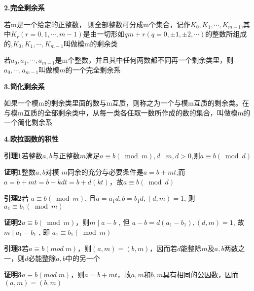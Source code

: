 \documentclass[a4paper,12pt]{article}
\begin{document}
\textbf{2.完全剩余系}\par
若m是一个给定的正整数， 则全部整数可分成m个集合，记作$K_0,K_1,\cdots,K_{m-1}$,其中$K_r(r=0,1,\cdots,m-1)$是由一切形如$qm+r(q=0,\pm1,\pm2,\cdots)$的整数所组成的,$K_0,K_1,\cdots,K_{m-1}$叫做模m的剩余类\par 
若$a_0,a_1,\cdots,a_{m-1}$是m个整数，并且其中任何两数都不同再一个剩余类里，则$a_0,\cdots,a_{m-1}$叫做模$m$的一个完全剩余系\par 
\quad  \par 



\textbf{3.简化剩余系}\par
如果一个模m的剩余类里面的数与m互质，则称之为一个与模m互质的剩余类。在与模m互质的全部剩余类中，从每一类各任取一数所作成的数的集合，叫做模m的一个简化剩余系\par
\quad  \par 



\textbf{4.欧拉函数的积性}\par

\textbf{引理1}\quad 若整数$a,b$与正整数$m$满足$a \equiv b(\bmod m), d \mid m, d>0 $,则$a \equiv b(\bmod d) $\par
\textbf{证明1}\quad 整数$  a, b  $对模 $ m  $同余的充分与必要条件是$a=b+m t$,而$a=b+mt=b+kdt=b+d(kt)$，故$a \equiv b(\bmod d) $\par

\textbf{引理2}\quad 若 $ a \equiv b(\bmod m) $, $且  a=a_{1} d, b=b_{1} d,(d, m)=1 $, 则 $ a_{1} \equiv b_{1}(\bmod m) $\par
\textbf{证明2}\quad $ a \equiv b(\bmod m) $，则$ m \mid a-b$ , 但  $a-b=d\left(a_{1}-b_{1}\right),(d, m)=1 $, 故 $ m \mid a_{1}-b_{1}$ , 即  $a_{1} \equiv b_{1}(\bmod m)$\par

\textbf{引理3}\quad 若$a\equiv b(mod\;m)$，则$(a,m)=(b,m)$，因而若$d$能整除$m$及$a,b$两数之一，则$d$必能整除$a,b$中的另一个\par 
\textbf{证明3}\quad $a\equiv b(mod\;m)$，则$a=b+m t$，故$a,m和b,m$具有相同的公因数，因而$(a,m)=(b,m)$\par 
\end{document}
